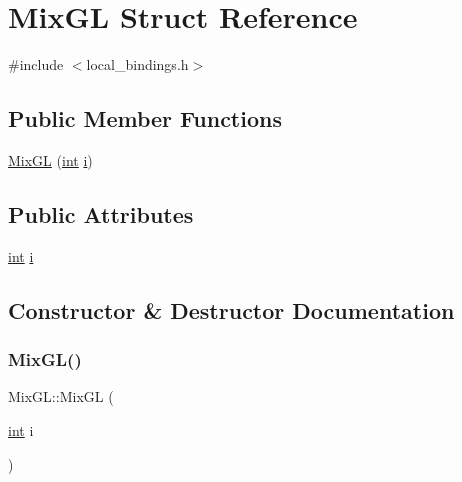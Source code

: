 \hypertarget{struct_mix_g_l}{}\section{Mix\+GL Struct Reference}
\label{struct_mix_g_l}


{\ttfamily \#include $<$local\+\_\+bindings.\+h$>$}

\subsection*{Public Member Functions}
\begin{DoxyCompactItemize}
\item 
\mbox{\hyperlink{struct_mix_g_l_a6f84c2455d76e615c13c371314e36fd7}{Mix\+GL}} (\mbox{\hyperlink{warnings_8h_a74f207b5aa4ba51c3a2ad59b219a423b}{int}} \mbox{\hyperlink{struct_mix_g_l_acc5f9e12cbae388da68294bbb1001bdd}{i}})
\end{DoxyCompactItemize}
\subsection*{Public Attributes}
\begin{DoxyCompactItemize}
\item 
\mbox{\hyperlink{warnings_8h_a74f207b5aa4ba51c3a2ad59b219a423b}{int}} \mbox{\hyperlink{struct_mix_g_l_acc5f9e12cbae388da68294bbb1001bdd}{i}}
\end{DoxyCompactItemize}


\subsection{Constructor \& Destructor Documentation}
\mbox{\label{struct_mix_g_l_a6f84c2455d76e615c13c371314e36fd7}} 
\subsubsection{\texorpdfstring{MixGL()}{MixGL()}}
{\footnotesize\ttfamily Mix\+G\+L\+::\+Mix\+GL (\begin{DoxyParamCaption}\item[{\mbox{\hyperlink{warnings_8h_a74f207b5aa4ba51c3a2ad59b219a423b}{int}}}]{i }\end{DoxyParamCaption})\hspace{0.3cm}{\ttfamily [inline]}}




